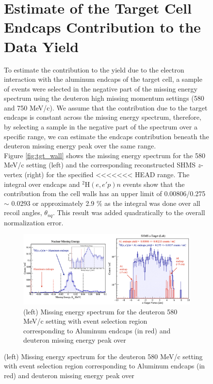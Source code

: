 \documentclass[aps, prl]{revtex4-2}  %
\begin{document}
\begin{figure}[!h]
\section{\large Estimate of the Target Cell Endcaps Contribution to the Data Yield}
\indent To estimate the contribution to the yield due to the electron interaction with the aluminum endcaps of the target cell,
a sample of events were selected in the negative part of the missing energy spectrum using the deuteron high missing momentum settings (580 and 750 MeV/c).
We assume that the contribution due to the target endcaps is constant across the missing energy spectrum, therefore, by selecting a sample in the
negative part of the spectrum over a specific range, we can estimate the endcaps contribution beneath the deuteron missing energy peak over the same range.\\
\indent Figure \ref{fig:tgt_wall} shows the missing energy spectrum for the 580 MeV/c setting (left) and the corresponding reconstructed SHMS $z$-vertex (right) for the specified
<<<<<<< HEAD
range. The integral over endcaps and $^{2}\mathrm{H}(e,e'p)n$ events show that the contribution from the cell walls has an upper limit of 0.00806/0.275 $\sim$ 0.0293 or approximately 2.9 $\%$
as the integral was done over all recoil angles, $\theta_{nq}$. This result was added quadratically to the overall normalization error.
\begin{figure}[!h]
\includegraphics[scale=0.33]{plots/tgt_bkg_d2_pm580_allthnq.png}
\caption{(left) Missing energy spectrum for the deuteron 580 MeV/c setting with event selection region corresponding to Aluminum endcaps (in red) and deuteron missing energy peak over
}
\end{figure}
\end{figure}
\end{document}
